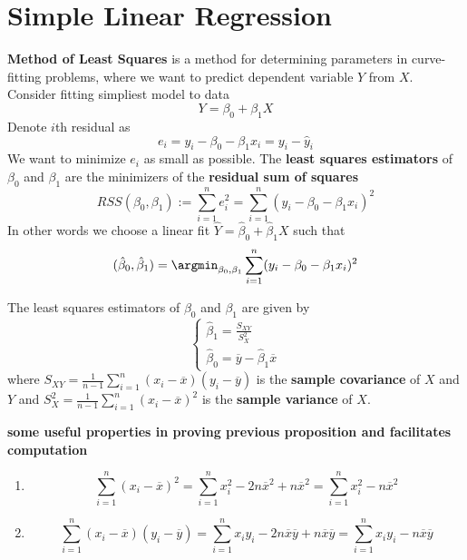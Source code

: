 \documentclass[11pt]{article}
\begin{document}
\section*{Simple Linear Regression}


\begin{defn*}
  \textbf{Method of Least Squares} is a method for determining parameters in curve-fitting problems, where we want to predict dependent variable $Y$ from $X$. Consider fitting simpliest model to data
  \[
    Y = \beta_0 + \beta_1 X
  \]
  Denote $i$th residual as
  \[
    e_i = y_i - \beta_0 - \beta_1 x_i = y_i - \hat{y}_i
  \]
  We want to minimize $e_i$ as small as possible. The \textbf{least squares estimators} of $\beta_0$ and $\beta_1$ are the minimizers of the \textbf{residual sum of squares}
  \[
    RSS(\beta_0, \beta_1) := \sum_{i=1}^n e_i^2 = \sum_{i=1}^n (y_i - \beta_0 - \beta_1 x_i)^2
   \]
   In other words we choose a linear fit $\hat{Y} = \hat{\beta}_0 + \hat{\beta}_1 X$ such that
   \[
    (\hat{\beta}_0 ,\hat{\beta}_1) = \argmin_{\beta_0, \beta_1} \sum_{i=1}^n (y_i - \beta_0 - \beta_1 x_i)^2
   \]
\end{defn*}

\begin{proposition*}
  The least squares estimators of $\beta_0$ and $\beta_1$ are given by
  \[
    \begin{cases}
      \hat{\beta}_1 = \frac{S_{XY}}{S_X^2}\\
      \hat{\beta}_0 = \overline{y} - \hat{\beta}_1 \overline{x}
    \end{cases}
  \]
  where $S_{XY} = \frac{1}{n-1} \sum_{i=1}^n (x_i - \overline{x})(y_i - \overline{y})$ is the \textbf{sample covariance} of $X$ and $Y$ and $S_X^2 = \frac{1}{n-1}\sum_{i=1}^{n}(x_i - \overline{x})^2$ is the \textbf{sample variance} of $X$.
\end{proposition*}

\begin{lemma*}
  \textbf{some useful properties in proving previous proposition and facilitates computation}
  \begin{enumerate}
    \item
    \[
      \sum_{i=1}^n (x_i - \overline{x})^2 = \sum_{i=1}^n x_i^2 - 2n\overline{x}^2 + n\overline{x}^2= \sum_{i=1}^n x_i^2 - n\overline{x}^2
    \]
    \item
    \[
      \sum_{i=1}^n (x_i - \overline{x})(y_i - \overline{y}) = \sum_{i=1}^n x_iy_i - 2n\overline{x}\overline{y} + n\overline{x}\overline{y} =\sum_{i=1}^n x_iy_i - n\overline{x}\overline{y}
    \]
  \end{enumerate}
\end{lemma*}
\end{document}
